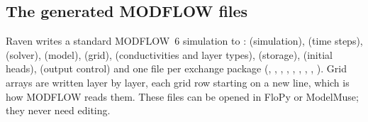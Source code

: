 \subsection{The generated MODFLOW files}
Raven writes a standard MODFLOW~6 simulation to :  (simulation), 
(time steps),  (solver),  (model),  (grid),  (conductivities and
layer types),  (storage),  (initial heads),  (output control) and one file per
exchange package (, , , , , , ,
, ). Grid arrays are written layer by layer, each grid row starting on a new line, which is
how MODFLOW reads them. These files can be opened in FloPy or ModelMuse; they never need editing.

